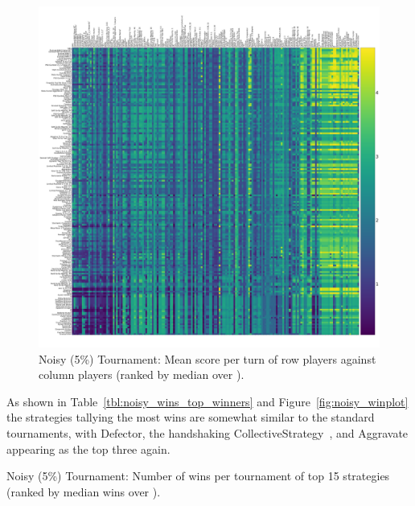 \documentclass{article}
\begin{document}
\begin{figure}[!hbtp]
    \centering
    \includegraphics[width=\textwidth]{./assets/noisy_scores_heatmap.pdf}
    \caption{Noisy (5\%) Tournament: Mean score per turn of row players against
    column players (ranked by median over
        \protecttournaments).}
    \label{fig:noisy_heatmap}
\end{figure}

As shown in Table~\ref{tbl:noisy_wins_top_winners} and
Figure~\ref{fig:noisy_winplot} the strategies tallying the most wins are
somewhat similar to the standard tournaments, with Defector, the handshaking
CollectiveStrategy~\cite{Li2009}, and Aggravate appearing as the top three again.

\begin{table}[!hbtp]
    \centering
        
        \caption{Noisy (5\%) Tournament: Number of wins per tournament
        of top 15 strategies (ranked by median wins over
        \protecttournaments).}
        \label{tbl:noisy_wins_top_winners}
\end{table}
\end{document}

